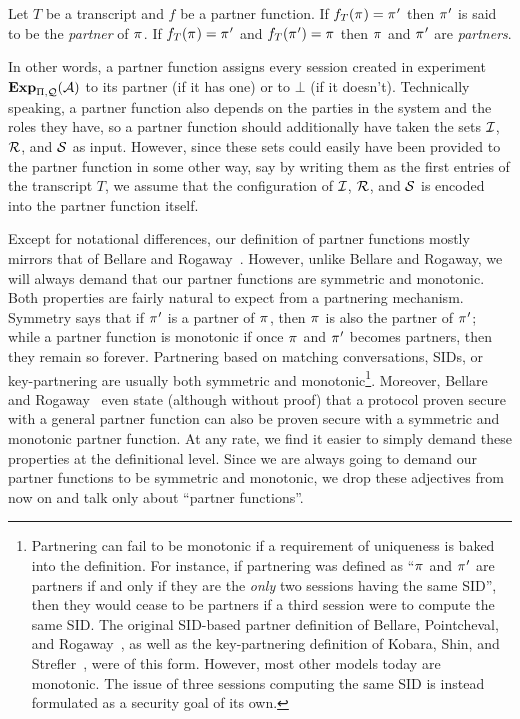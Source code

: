 \begin{definition}[Partnering]
Let $T$ be a transcript and $f$ be a partner function.
If $f_T(\oracle) = \oracle'$ then $\oracle'$ is said to be the \emph{partner} of $\oracle$.
If $f_T(\oracle) = \oracle'$ and $f_T(\oracle') = \oracle$ then $\oracle$ and $\oracle'$ are \emph{partners}.
\end{definition}

In other words,
a partner function assigns every session created in experiment $\mathbf{Exp}_{\mathrm{\Pi},\mathcal{Q}}^{}(\mathcal{A})$ to its partner 
(if it has one) or to $\bot$ (if it doesn't).
Technically speaking,
a partner function also depends on the parties in the system and the roles they have,
so a partner function should additionally have taken the sets $\mathcal{I}$, $\mathcal{R}$, and $\mathcal{S}$ as  input.
However,
since these sets could easily have been provided to the partner function in some other way,
say by writing them as the first entries of the transcript $T$,
we assume that the configuration of $\mathcal{I}$, $\mathcal{R}$, and $\mathcal{S}$ is encoded into the partner function itself. 

Except for notational differences,
our definition of partner functions mostly mirrors that of Bellare and Rogaway~\cite{STOC:BelRog95}.
However,
unlike Bellare and Rogaway,
we will always demand that our partner functions are symmetric and monotonic.
Both properties are fairly natural to expect from a partnering mechanism.
Symmetry says that if $\oracle'$ is a partner of $\oracle$,
then $\oracle$ is also the partner of $\oracle'$;
while a partner function is monotonic if once $\oracle$ and $\oracle'$ becomes partners,
then they remain so forever.
Partnering based on matching conversations,
SIDs,
or key-partnering are usually both symmetric and monotonic\footnote{Partnering 
can fail to be monotonic if a requirement of uniqueness is baked into the definition.
For instance,
if partnering was defined as ``$\oracle$ and $\oracle'$ are partners if and only if they are the \emph{only} two sessions having the same SID'',
then they would cease to be partners if a third session were to compute the same SID.
The original SID-based partner definition of Bellare, Pointcheval, and Rogaway~\cite{EC:BelPoiRog00},
as well as the key-partnering definition of Kobara, Shin, and Strefler~\cite{ASIACCS:KobShiStr09},
were of this form.
However,
most other models today are monotonic.
The issue of three sessions computing the same SID is instead formulated as a security goal of its own.
}.
Moreover,
Bellare and Rogaway~\cite[Thm~5]{STOC:BelRog95} even state (although without proof) 
that a protocol proven secure with a general partner function can also be proven secure with a symmetric and monotonic partner function.
At any rate,
we find it easier to simply demand these properties at the definitional level.
Since we are always going to demand our partner functions to be symmetric and monotonic,
we drop these adjectives from now on and talk only about ``partner functions''.




